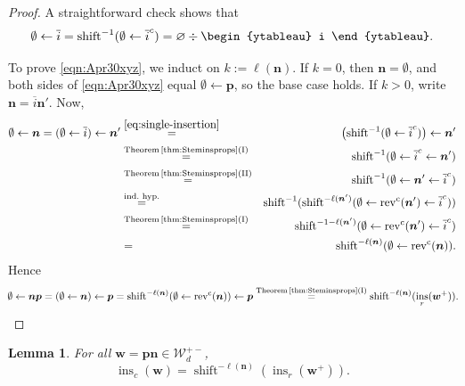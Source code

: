 \documentclass[12pt]{amsart}
\newcommand{\bs}{\boldsymbol}
\DeclareMathOperator{\ins}{\operatorname{ins}}
\newtheorem{lemma}[theorem]{Lemma}
\theoremstyle{definition}
\theoremstyle{remark}
\newcommand{\barindex}[1]{\overline{#1}}
\begin{document}
\begin{proof}
A straightforward check shows that
\begin{equation} \label{eq:single-insertion}
\emptyset\leftarrow\barindex{i} = \operatorname{shift}^{-1}(\emptyset\leftarrow \barindex{i}^c) = \varnothing \div \vcenter{\hbox{\begin{ytableau} i \end{ytableau}}}.
\end{equation}

To prove \eqref{eqn:Apr30xyz}, we induct on $k := \ell({\bs n})$. If $k=0$, then ${\bs n} = \emptyset$, and both sides of \eqref{eqn:Apr30xyz} equal $\emptyset\leftarrow {\bs p}$, so the base case holds. If $k>0$, write ${\bs n} = \barindex{i}{\bs n'}$. Now,
\begin{eqnarray}\nonumber
\emptyset\leftarrow{\bs n} = (\emptyset \leftarrow \barindex{i}) \leftarrow {\bs n'} 
& \stackrel{\eqref{eq:single-insertion}}{=} & \left(\operatorname{shift}^{-1}(\emptyset\leftarrow \barindex{i}^c)\right) \leftarrow {\bs n'}\\ \nonumber
&  \stackrel{\text{Theorem~\!\ref{thm:Steminsprops}(I)}}{=} & \operatorname{shift}^{-1}(\emptyset\leftarrow 
\barindex{i}^c \leftarrow {\bs n'})\\ \nonumber
 & \stackrel{\text{Theorem~\!\ref{thm:Steminsprops}(II)}}{=} & \operatorname{shift}^{-1}(\emptyset \leftarrow {\bs n'}\leftarrow \barindex{i}^c)\\ \nonumber
 & \stackrel{\text{ind.~hyp.}}{=} & \operatorname{shift}^{-1}(\operatorname{shift}^{-\ell({\bs n'})}
(\emptyset \leftarrow \operatorname{rev^c}({\bs n'}) \leftarrow \barindex{i}^c))\\ \nonumber
 &  \stackrel{\text{Theorem~\!\ref{thm:Steminsprops}(I)}}{=} & \operatorname{shift}^{-1-\ell({\bs n'})}
(\emptyset \leftarrow \operatorname{rev^c}({\bs n'})\leftarrow \barindex{i}^c)\\ \nonumber
& = & \operatorname{shift}^{-\ell({\bs n})}
(\emptyset \leftarrow \operatorname{rev^c}({\bs n})).\nonumber
\end{eqnarray}
Hence 
\[\!\emptyset\leftarrow{\bs n}{\bs p}= (\emptyset\leftarrow {\bs n})\leftarrow {\bs p}
=\operatorname{shift}^{-\ell({\bs n})}
(\emptyset \leftarrow \operatorname{rev^c}({\bs n})) \leftarrow{\bs p}
\stackrel{\text{Theorem~\!\ref{thm:Steminsprops}(I)}}{=}\operatorname{shift}^{-\ell({\bs n})}
(\ins_r({\bs w}^+)).\!\!\qedhere
\]
\end{proof}

\begin{lemma} \label{lem:col-ins-row-ins}
For all $\bs{w}={\bs p}{\bs n}\in {\mathcal W}_{d}^{+-}$,
\[
\ins_c(\bs{w}) = \operatorname{shift}^{-\ell(\bs{n})}(\ins_r(\bs{w}^+)).
\]
\end{lemma}
\end{document}
